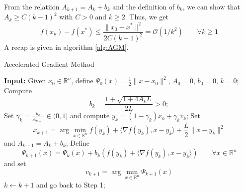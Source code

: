 \documentclass[12pt, openany]{report}
\newcommand{\R}{\mathbb{R}}
\theoremstyle{definition}
\begin{document}
From the relatiion $A_{k+1} = A_k + b_k$ and the definition of $b_k$, we can show that $A_k\ge C(k-1)^2$ with $C>0$ and $k\ge2$. Thus, we get 
\begin{equation}
	f(x_k) - f(x^*) \le \frac{\|x_0-x^*\|^2}{2C(k-1)^2} = \mathcal{O}(1/k^2) \qquad \forall k\ge1
\end{equation}
A recap is given in algorithm \ref{alg:AGM}.\\
\begin{algorithm}
	\caption{Accelerated Gradient Method}
	\label{alg:AGM}
	\begin{algorithmic}[1]
		\State \textbf{Input:} Given $x_0 \in \R^n$, define $\Psi_0(x)=\frac{1}{2}\|x-x_0\|^2$, $A_0=0$, $b_0=0$, $k=0$;
		\State Compute 
		\begin{equation}
			b_k = \frac{1+\sqrt{1+4A_kL}}{2L}>0;
		\end{equation}
		\State Set $\gamma_k = \frac{b_k}{A_{k+1}}\in (0,1]$ and compute $y_k = (1-\gamma_k)x_k + \gamma_k v_k$;
		\State Set 
		\begin{equation}
			x_{k+1} = \arg\min_{x \in \R^n} f(y_k) + \langle \nabla f(y_k),x-y_k\rangle + \frac{L}{2}\|x-y_k\|^2
		\end{equation}
		and $A_{k+1} = A_k + b_k$;
		\State Define 
		\begin{equation}
			\Psi_{k+1}(x) = \Psi_k(x) + b_k \left(f(y_k)+\langle \nabla f(y_k),x-y_k\rangle \right) \qquad \forall x \in \R^n
		\end{equation}
		and set 
		\begin{equation}
			v_{k+1} = \arg\min_{x \in \R^n} \Psi_{k+1}(x)
		\end{equation}
		\State $k \gets k+1$ and go back to Step 1;
	\end{algorithmic}
\end{algorithm}
\end{document}
